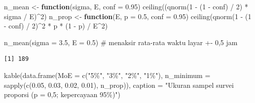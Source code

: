 \documentclass[
  indonesian,
  letterpaper,
]{book}
\newenvironment{Shaded}{\begin{snugshade}}{\end{snugshade}}
\newcommand{\AttributeTok}[1]{\textcolor[rgb]{0.40,0.45,0.13}{#1}}
\newcommand{\CommentTok}[1]{\textcolor[rgb]{0.37,0.37,0.37}{#1}}
\newcommand{\ControlFlowTok}[1]{\textcolor[rgb]{0.00,0.23,0.31}{\textbf{#1}}}
\newcommand{\DecValTok}[1]{\textcolor[rgb]{0.68,0.00,0.00}{#1}}
\newcommand{\FloatTok}[1]{\textcolor[rgb]{0.68,0.00,0.00}{#1}}
\newcommand{\FunctionTok}[1]{\textcolor[rgb]{0.28,0.35,0.67}{#1}}
\newcommand{\NormalTok}[1]{\textcolor[rgb]{0.00,0.23,0.31}{#1}}
\newcommand{\OtherTok}[1]{\textcolor[rgb]{0.00,0.23,0.31}{#1}}
\newcommand{\SpecialCharTok}[1]{\textcolor[rgb]{0.37,0.37,0.37}{#1}}
\newcommand{\StringTok}[1]{\textcolor[rgb]{0.13,0.47,0.30}{#1}}
\begin{document}
\begin{Shaded}
\begin{Highlighting}[]
\NormalTok{n\_mean }\OtherTok{\textless{}{-}} \ControlFlowTok{function}\NormalTok{(sigma, E, }\AttributeTok{conf =} \FloatTok{0.95}\NormalTok{) }\FunctionTok{ceiling}\NormalTok{((}\FunctionTok{qnorm}\NormalTok{(}\DecValTok{1} \SpecialCharTok{{-}}\NormalTok{ (}\DecValTok{1} \SpecialCharTok{{-}}\NormalTok{ conf) }\SpecialCharTok{/} \DecValTok{2}\NormalTok{) }\SpecialCharTok{*}\NormalTok{ sigma }\SpecialCharTok{/}\NormalTok{ E)}\SpecialCharTok{\^{}}\DecValTok{2}\NormalTok{)}
\NormalTok{n\_prop }\OtherTok{\textless{}{-}} \ControlFlowTok{function}\NormalTok{(E, }\AttributeTok{p =} \FloatTok{0.5}\NormalTok{, }\AttributeTok{conf =} \FloatTok{0.95}\NormalTok{) }\FunctionTok{ceiling}\NormalTok{(}\FunctionTok{qnorm}\NormalTok{(}\DecValTok{1} \SpecialCharTok{{-}}\NormalTok{ (}\DecValTok{1} \SpecialCharTok{{-}}\NormalTok{ conf) }\SpecialCharTok{/} \DecValTok{2}\NormalTok{)}\SpecialCharTok{\^{}}\DecValTok{2} \SpecialCharTok{*}\NormalTok{ p }\SpecialCharTok{*}\NormalTok{ (}\DecValTok{1} \SpecialCharTok{{-}}\NormalTok{ p) }\SpecialCharTok{/}\NormalTok{ E}\SpecialCharTok{\^{}}\DecValTok{2}\NormalTok{)}

\FunctionTok{n\_mean}\NormalTok{(}\AttributeTok{sigma =} \FloatTok{3.5}\NormalTok{, }\AttributeTok{E =} \FloatTok{0.5}\NormalTok{)    }\CommentTok{\# menaksir rata{-}rata waktu layar +{-} 0,5 jam}
\end{Highlighting}
\end{Shaded}

\begin{verbatim}
[1] 189
\end{verbatim}

\begin{Shaded}
\begin{Highlighting}[]
\FunctionTok{kable}\NormalTok{(}\FunctionTok{data.frame}\NormalTok{(}\AttributeTok{MoE =} \FunctionTok{c}\NormalTok{(}\StringTok{"5\%"}\NormalTok{, }\StringTok{"3\%"}\NormalTok{, }\StringTok{"2\%"}\NormalTok{, }\StringTok{"1\%"}\NormalTok{),}
                 \AttributeTok{n\_minimum =} \FunctionTok{sapply}\NormalTok{(}\FunctionTok{c}\NormalTok{(}\FloatTok{0.05}\NormalTok{, }\FloatTok{0.03}\NormalTok{, }\FloatTok{0.02}\NormalTok{, }\FloatTok{0.01}\NormalTok{), n\_prop)),}
      \AttributeTok{caption =} \StringTok{"Ukuran sampel survei proporsi (p = 0,5; kepercayaan 95\%)"}\NormalTok{)}
\end{Highlighting}
\end{Shaded}
\end{document}
